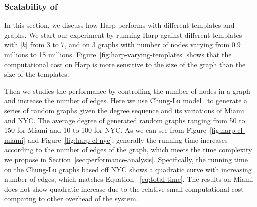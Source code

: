 \subsubsection{Scalability of \harpsahad{}}

In this section, we discuss how Harp performs with different templates and
graphs. We start our experiment by running Harp against different templates with
$|k|$ from 3 to 7, and on 3 graphs with number of nodes varying from 0.9
millions to 18 millions. Figure~\ref{fig:harp-varying-templates} shows that the
computational cost on Harp is more sensitive to the size of the graph than the
size of the templates.   


Then we studies the performance by controlling the number of nodes in a graph and
increase the number of edges. Here we use Chung-Lu model~\cite{aiello2000random}
to generate a series of random graphs given the degree sequence and its
variations of Miami and NYC.  The average degree of generated random graphs
ranging from 50 to 150 for Miami and 10 to 100 for NYC. As we can see from
Figure~\ref{fig:harp-cl-miami} and Figure~\ref{fig:harp-cl-nyc}, generally the
running time increases according to the number of edges of the graph, which
meets the time complexity we propose in Section~\ref{sec:performance-analysis}.
Specifically, the running time on the Chung-Lu graphs based off NYC shows a
quadratic curve with increasing number of edges, which matches Equation
~\ref{eq:total-time}. The results on Miami does not show quadratic increase
due to the relative small computational cost comparing to other overhead of the
system.  


